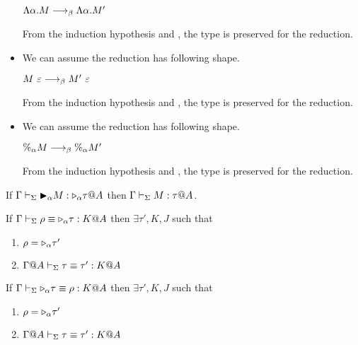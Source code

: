 \begin{itemize}
	      $\Lambda\alpha. M \longrightarrow_{\beta} \Lambda\alpha. M'$
	      	      	      
	      From the induction hypothesis and \TGen, the type is preserved for the reduction.
	      	      	      
	\item \TIns
	      	      	      
	      We can assume the reduction has following shape.
	      	      	      
	      $M\ \varepsilon \longrightarrow_{\beta} M'\ \varepsilon$
	      	      	      
	      From the induction hypothesis and \TIns, the type is preserved for the reduction.
	      	      	      
	\item \TCsp
	      	      	      
	      We can assume the reduction has following shape.
	      	      	      
	      $\%_\alpha M \longrightarrow_{\beta} \%_\alpha M'$
	      	      	      
	      From the induction hypothesis and \TCsp, the type is preserved for the reduction.
	      	      	      
	      \fi
	      	      	      
\end{itemize}

\begin{lemma}
	\begin{item}
	      \item If $\G \V \TB_\alpha M : \TW_\alpha \tau@A$ then $\Gamma \vdash_\Sigma M : \tau @A$.
	      \item If $\Gamma \vdash_\Sigma \rho \equiv  {\mathop{\triangleright}}_\alpha \tau : K @A$ then $\exists \tau', K, J$ such that
	      \begin{enumerate}
	      	\item $\rho = {\mathop{\triangleright}}_\alpha \tau'$
	      	\item $\Gamma @A\vdash_\Sigma \tau \equiv \tau' : K @A$
	      \end{enumerate}
	      \item If $\Gamma \vdash_\Sigma {\mathop{\triangleright}}_\alpha \tau \equiv \rho : K @A$ then $\exists \tau', K, J$ such that
	      \begin{enumerate}
	      	\item $\rho = {\mathop{\triangleright}}_\alpha \tau'$
	      	\item $\Gamma @A\vdash_\Sigma \tau \equiv \tau' : K @A$
	      \end{enumerate}
	\end{item}
\end{lemma}

